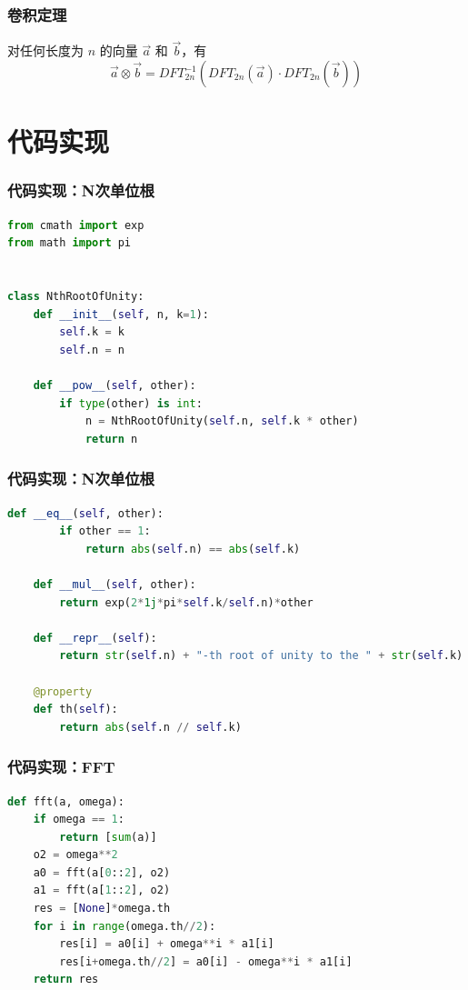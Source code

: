 \documentclass[UTF8]{ctexbeamer}
\begin{document}
\begin{frame}
    \frametitle{卷积定理}
    对任何长度为 $n$ 的向量 $\vec{a}$ 和 $\vec{b}$，有
    $$\vec{a} \otimes \vec{b} = DFT_{2n}^{-1}(DFT_{2n}(\vec{a}) · DFT_{2n}(\vec{b}))$$
\end{frame}

\section{代码实现}

\begin{frame}[fragile]
    \frametitle{代码实现：N次单位根}
    \begin{lstlisting}[language=Python]
from cmath import exp
from math import pi


class NthRootOfUnity:
    def __init__(self, n, k=1):
        self.k = k
        self.n = n

    def __pow__(self, other):
        if type(other) is int:
            n = NthRootOfUnity(self.n, self.k * other)
            return n
    \end{lstlisting}
\end{frame}

\begin{frame}[fragile]
    \frametitle{代码实现：N次单位根}
    \begin{lstlisting}[language=Python] 
    def __eq__(self, other):
        if other == 1:
            return abs(self.n) == abs(self.k)

    def __mul__(self, other):
        return exp(2*1j*pi*self.k/self.n)*other

    def __repr__(self):
        return str(self.n) + "-th root of unity to the " + str(self.k)

    @property
    def th(self):
        return abs(self.n // self.k)
    \end{lstlisting}
\end{frame}

\begin{frame}[fragile]
    \frametitle{代码实现：FFT}
    \begin{lstlisting}[language=Python] 
def fft(a, omega):
    if omega == 1:
        return [sum(a)]
    o2 = omega**2
    a0 = fft(a[0::2], o2)
    a1 = fft(a[1::2], o2)
    res = [None]*omega.th
    for i in range(omega.th//2):
        res[i] = a0[i] + omega**i * a1[i]
        res[i+omega.th//2] = a0[i] - omega**i * a1[i]
    return res
    \end{lstlisting}
\end{frame}
\end{document}
